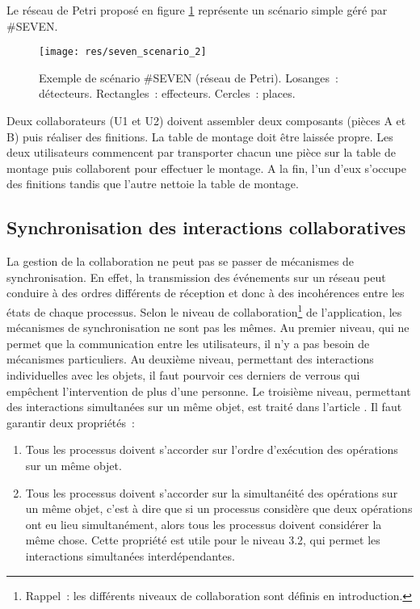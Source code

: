\documentclass[11pt]{article}
\begin{document}
Le réseau de Petri proposé en figure \ref{fig:seven} représente un scénario simple géré par \#SEVEN.

\begin{figure}[!h]
\centering
\texttt{[image: res/seven\_scenario\_2]}
\caption{\label{fig:seven}Exemple de scénario \#SEVEN (réseau de Petri). Losanges~: détecteurs. Rectangles~: effecteurs. Cercles~: places.}
\end{figure}

Deux collaborateurs (U1 et U2) doivent assembler deux composants (pièces A et B) puis réaliser des finitions. La table de montage doit être laissée propre. Les deux utilisateurs commencent par transporter chacun une pièce sur la table de montage puis collaborent pour effectuer le montage. A la fin, l'un d'eux s'occupe des finitions tandis que l'autre nettoie la table de montage.

\subsection{Synchronisation des interactions collaboratives}

La gestion de la collaboration ne peut pas se passer de mécanismes de synchronisation. En effet, la transmission des événements sur un réseau peut conduire à des ordres différents de réception et donc à des incohérences entre les états de chaque processus. Selon le niveau de collaboration\footnote{Rappel~: les différents niveaux de collaboration sont définis en introduction.} de l'application, les mécanismes de synchronisation ne sont pas les mêmes. Au premier niveau, qui ne permet que la communication entre les utilisateurs, il n'y a pas besoin de mécanismes particuliers. Au deuxième niveau, permettant des interactions individuelles avec les objets, il faut pourvoir ces derniers de verrous qui empêchent l'intervention de plus d'une personne. Le troisième niveau, permettant des interactions simultanées sur un même objet, est traité dans l'article \cite{margery}. Il faut garantir deux propriétés~:
\begin{enumerate}
	\item Tous les processus doivent s'accorder sur l'ordre d'exécution des opérations sur un même objet.
	\item Tous les processus doivent s'accorder sur la simultanéité des opérations sur un même objet, c'est à dire que si un processus considère que deux opérations ont eu lieu simultanément, alors tous les processus doivent considérer la même chose. Cette propriété est utile pour le niveau 3.2, qui permet les interactions simultanées interdépendantes.
\end{enumerate}
\end{document}
